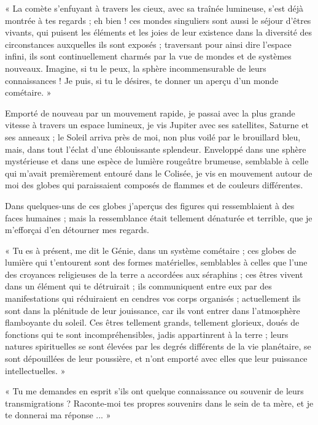 \documentclass[a4paper, 11pt, oneside]{article}
\begin{document}
« La comète s'enfuyant à travers les cieux, avec sa traînée lumineuse, s'est déjà montrée à tes regards ; eh bien ! ces mondes singuliers sont aussi le séjour d'êtres vivants, qui puisent les éléments et les joies de leur existence dans la diversité des circonstances auxquelles ils sont exposés ; traversant pour ainsi dire l'espace infini, ils sont continuellement charmés par la vue de mondes et de systèmes nouveaux. Imagine, si tu le peux, la sphère incommensurable de leurs connaissances ! Je puis, si tu le désires, te donner un aperçu d'un monde cométaire. »

Emporté de nouveau par un mouvement rapide, je passai avec la plus grande vitesse à travers un espace lumineux, je vis Jupiter avec ses satellites, Saturne et ses anneaux ; le Soleil arriva près de moi, non plus voilé par le brouillard bleu, mais, dans tout l'éclat d'une éblouissante splendeur. Enveloppé dans une sphère mystérieuse et dans une espèce de lumière rougeâtre brumeuse, semblable à celle qui m'avait premièrement entouré dans le Colisée, je vis en mouvement autour de moi des globes qui paraissaient composés de flammes et de couleurs différentes.

Dans quelques-uns de ces globes j'aperçus des figures qui ressemblaient à des faces humaines ; mais la ressemblance était tellement dénaturée et terrible, que je m'efforçai d'en détourner mes regards.

« Tu es à présent, me dit le Génie, dans un système cométaire ; ces globes de lumière qui t'entourent sont des formes matérielles, semblables à celles que l'une des croyances religieuses de la terre a accordées aux séraphins ; ces êtres vivent dans un élément qui te détruirait ; ils communiquent entre eux par des manifestations qui réduiraient en cendres vos corps organisés ; actuellement ils sont dans la plénitude de leur jouissance, car ils vont entrer dans l'atmosphère flamboyante du soleil. Ces êtres tellement grands, tellement glorieux, doués de fonctions qui te sont incompréhensibles, jadis appartinrent à la terre ; leurs natures spirituelles se sont élevées par les degrés différents de la vie planétaire, se sont dépouillées de leur poussière, et n'ont emporté avec elles que leur puissance intellectuelles. »

« Tu me demandes en esprit s'ils ont quelque connaissance ou souvenir de leurs transmigrations ? Raconte-moi tes propres souvenirs dans le sein de ta mère, et je te donnerai ma réponse ... »
\end{document}
